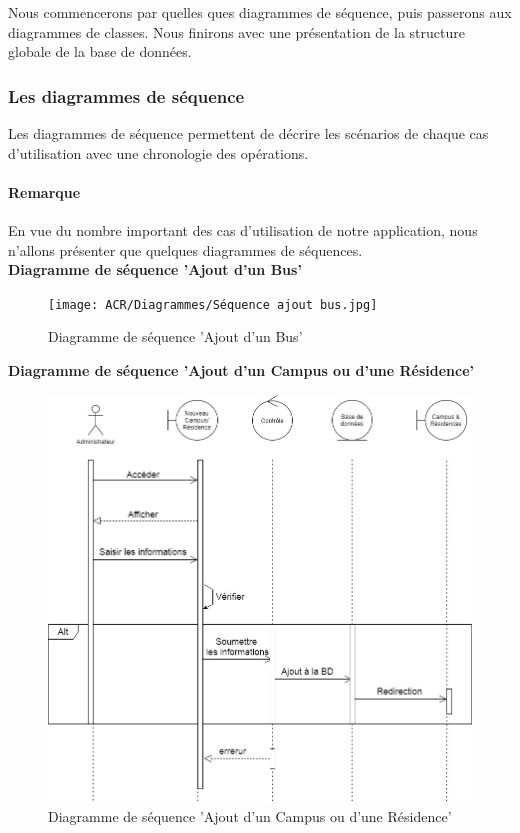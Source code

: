 Nous commencerons par quelles ques diagrammes de séquence, puis passerons aux diagrammes de classes. Nous finirons avec une présentation de la structure globale de la base de données.\\

\subsubsection{Les diagrammes de séquence}
Les diagrammes de séquence permettent de décrire les scénarios de chaque cas d'utilisation avec une chronologie des opérations.

\paragraph*{Remarque} En vue du nombre important des cas d'utilisation de notre application, nous n'allons présenter que quelques diagrammes de séquences.\\

\textbf{Diagramme de séquence 'Ajout d'un Bus'}
\begin{figure}[H]
    \centering
    \texttt{[image: ACR/Diagrammes/Séquence ajout bus.jpg]}
    \caption{Diagramme de séquence 'Ajout d'un Bus'}
\end{figure}

\textbf{Diagramme de séquence 'Ajout d'un Campus ou d'une Résidence'}
\begin{figure}[H]
    \centering
    \includegraphics[scale=0.55]{ACR/Diagrammes/Séquence Ajout campus&résidence.jpg}
    \caption{Diagramme de séquence 'Ajout d'un Campus ou d'une Résidence'}
\end{figure}

